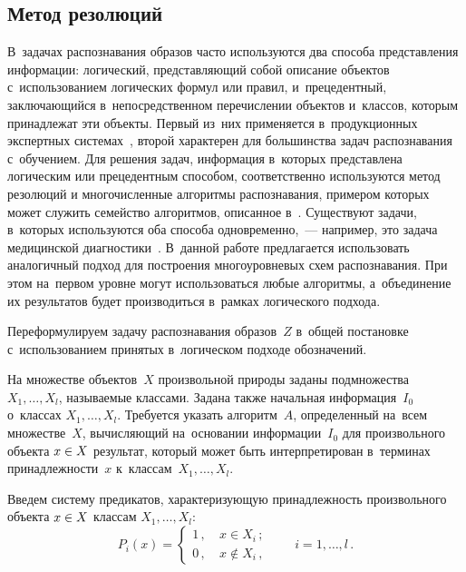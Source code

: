 \begin{multicols}{2}
\section{Метод резолюций}

В~задачах распознавания образов часто используются два способа представления информации:
 логический, представляющий собой описание объектов с~использованием логических 
 формул или правил,
 и~прецедентный, заключающийся в~непосредственном перечислении объектов и~классов, 
 которым принадлежат эти объекты.
Первый из~них\linebreak
 применяется в~продукционных экспертных системах~\cite{Giarratano}, 
второй характерен для большинства задач распознавания с~обучением.
Для решения \mbox{задач}, информация в~которых представлена логическим или прецедентным 
способом, соответственно используются метод резолюций и многочисленные алгоритмы 
распознавания, примером которых может служить семейство алгоритмов, 
описанное в~\cite{krasn1998}.
Существуют задачи, в~которых используются оба способа одновременно,~--- например, 
это задача медицинской диагностики~\cite{ablam2011}.
В~данной работе предлагается использовать аналогичный подход для построения 
многоуровневых схем распознавания.
При этом на~первом уровне могут использоваться любые алгоритмы, 
а~объединение их результатов будет производиться в~рамках логического подхода.

Переформулируем задачу распознавания образов~$Z$ в~общей постановке~\cite{ablam2011} 
с~использованием принятых в~логическом подходе обозначений.

На множестве объектов~$X$ произвольной природы заданы 
подмножества $ X_{1},\ldots,X_{l} $, на\-зы\-ва\-емые классами.
Задана также начальная информация~$I_{0}$ о~классах $X _{1},\ldots,X_{l} $.
Требуется указать алгоритм~$A$, определенный на~всем множестве~$X$, 
вычисля\-ющий на~основании информации~$I_{0}$ для произвольного объекта $ x \hm\in X $ 
результат, который может быть интерпретирован в~терминах принадлежности~$x$ 
к~классам~$X _{1},\ldots,X_{l} $.

Введем систему предикатов, характеризующую принадлежность произвольного 
объекта $x \hm\in X $ классам $X _{1},\ldots,X_{l} $:
$$
P_{i}(x)=\begin{cases}
1\,, &\ x \in X_{i}\,; \\
0\,, &\ x \notin X_{i}\,,
\end{cases}\qquad i=1,\ldots,l \,. 
$$


\end{multicols}
